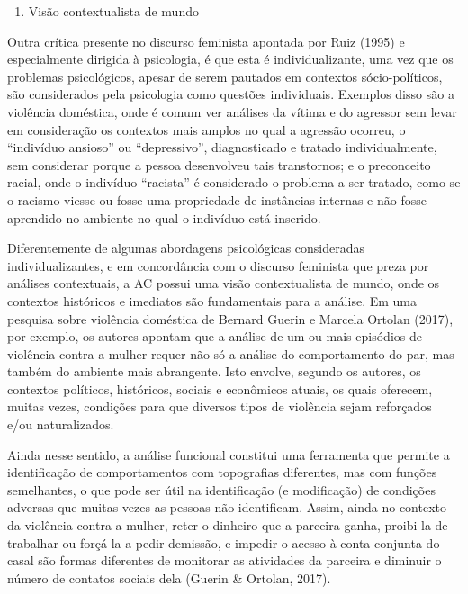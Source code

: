 \begin{enumerate}[resume]
    \item Visão contextualista de mundo
\end{enumerate} 

Outra crítica presente no discurso feminista apontada por Ruiz (1995) e especialmente dirigida à psicologia, é que esta é individualizante, uma vez que os problemas psicológicos, apesar de serem pautados em contextos sócio-políticos, são considerados pela psicologia como questões individuais. Exemplos disso são a violência doméstica, onde é comum ver análises da vítima e do agressor sem levar em consideração os contextos mais amplos no qual a agressão ocorreu, o ``indivíduo ansioso'' ou ``depressivo'', diagnosticado e tratado individualmente, sem considerar porque a pessoa desenvolveu tais transtornos; e o preconceito racial, onde o indivíduo ``racista'' é considerado o problema a ser tratado, como se o racismo viesse ou fosse uma propriedade de instâncias internas e não fosse aprendido no ambiente no qual o indivíduo está inserido. 

Diferentemente de algumas abordagens psicológicas consideradas individualizantes, e em concordância com o discurso feminista que preza por análises contextuais, a AC possui uma visão contextualista de mundo, onde os contextos históricos e imediatos são fundamentais para a análise. Em uma pesquisa sobre violência doméstica de Bernard Guerin e Marcela Ortolan (2017), por exemplo, os autores apontam que a análise de um ou mais episódios de violência contra a mulher requer não só a análise do comportamento do par, mas também do ambiente mais abrangente. Isto envolve, segundo os autores, os contextos políticos, históricos, sociais e econômicos atuais, os quais oferecem, muitas vezes, condições para que diversos tipos de violência sejam reforçados e/ou naturalizados. 

Ainda nesse sentido, a análise funcional constitui uma ferramenta que permite a identificação de comportamentos com topografias diferentes, mas com funções semelhantes, o que pode ser útil na identificação (e modificação) de condições adversas que muitas vezes as pessoas não identificam. Assim, ainda no contexto da violência contra a mulher, reter o dinheiro que a parceira ganha, proibi-la de trabalhar ou forçá-la a pedir demissão, e impedir o acesso à conta conjunta do casal são formas diferentes de monitorar as atividades da parceira e diminuir o número de contatos sociais dela (Guerin \& Ortolan, 2017).

